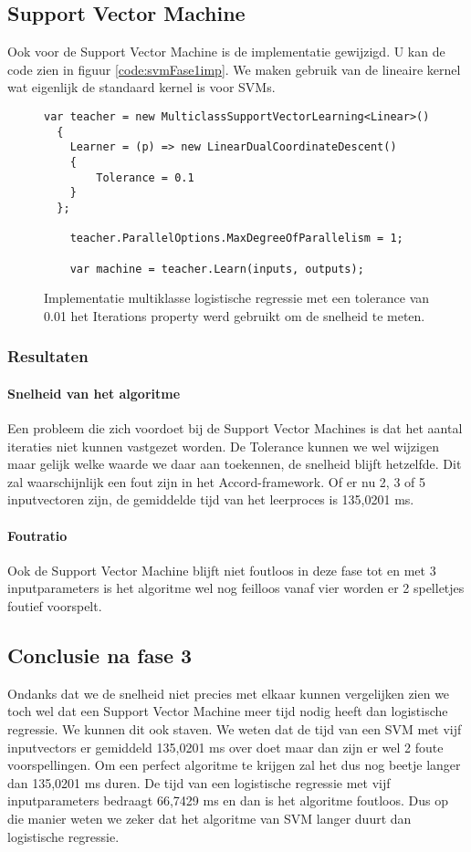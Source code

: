 \newpage
\subsection{Support Vector Machine}
\label{sec:supportvectormachineFase3}
Ook voor de Support Vector Machine is de implementatie gewijzigd. U kan de code zien in figuur \ref{code:svmFase1imp}. We maken gebruik van de lineaire kernel wat eigenlijk de standaard kernel is voor SVMs.
\begin{figure}[]
	\renewcommand{\figurename}{Code}
	\begin{lstlisting}
var teacher = new MulticlassSupportVectorLearning<Linear>()
  {
    Learner = (p) => new LinearDualCoordinateDescent()
    {
        Tolerance = 0.1
    }
  };

    teacher.ParallelOptions.MaxDegreeOfParallelism = 1;

    var machine = teacher.Learn(inputs, outputs);
	\end{lstlisting}
	\caption{Implementatie multiklasse logistische regressie met een tolerance van 0.01 het Iterations property werd gebruikt om de snelheid te meten.}
	\label{code:svmFase3imp}
\end{figure}


\subsubsection{Resultaten}
\paragraph{Snelheid van het algoritme} 
Een probleem die zich voordoet bij de Support Vector Machines is dat het aantal iteraties niet kunnen vastgezet worden. De Tolerance kunnen we wel wijzigen maar gelijk welke waarde we daar aan toekennen, de snelheid blijft hetzelfde. Dit zal waarschijnlijk een fout zijn in het Accord-framework. Of er nu 2, 3 of 5 inputvectoren zijn, de gemiddelde tijd van het leerproces is 135,0201 ms.


\paragraph{Foutratio}
Ook de Support Vector Machine blijft niet foutloos in deze fase tot en met 3 inputparameters is het algoritme wel nog feilloos vanaf vier worden er 2 spelletjes foutief voorspelt.  

\subsection{Conclusie na fase 3}
Ondanks dat we de snelheid niet precies met elkaar kunnen vergelijken zien we toch wel dat een Support Vector Machine meer tijd nodig heeft dan logistische regressie. We kunnen dit ook staven. We weten dat de tijd van een SVM met vijf inputvectors er gemiddeld 135,0201 ms over doet maar dan zijn er wel 2 foute voorspellingen. Om een perfect algoritme te krijgen zal het dus nog beetje langer dan 135,0201 ms duren. De tijd van een logistische regressie met vijf inputparameters bedraagt 66,7429 ms en dan is het algoritme foutloos. Dus op die manier weten we zeker dat het algoritme van SVM langer duurt dan logistische regressie. 

